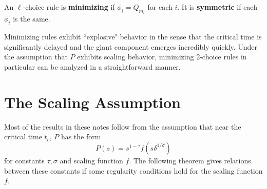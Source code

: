 \documentclass[twoside,10pt]{article}
\begin{document}
\begin{defn}[]
	An $\ell$-choice rule is \textbf{minimizing} if $\phi_i = Q_{m_i}$ for each $i$. It is \textbf{symmetric} if each $\phi_i$ is the same.
\end{defn}

Minimizing rules exhibit ``explosive" behavior in the sense that the critical time is significantly delayed and the giant component emerges incredibly quickly. Under the assumption that $P$ exhibits scaling behavior, minimizing 2-choice rules in particular can be analyzed in a straightforward manner.

\section{The Scaling Assumption}


Most of the results in these notes follow from the assumption that near the critical time $t_c$, $P$ has the form
\[
	P(s) = s^{1-\tau}f(s \delta^{1/\sigma})
\] for constants $\tau,\sigma$ and scaling function $f$.  The following theorem gives relations between these constants if some regularity conditions hold for the scaling function $f$.
\end{document}
